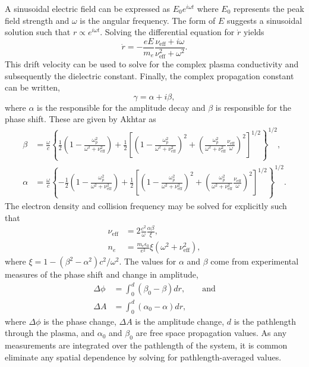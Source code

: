 A sinusoidal electric field can be expressed as $E_0 e^{i\omega t}$ where
$E_0$ represents the peak field strength and $\omega$ is the angular frequency.
The form of $E$ suggests a sinusoidal solution such that $r \propto e^{i\omega
t}$. Solving the differential equation for $\dot{r}$ yields
    \begin{equation}
        \dot{r} = -\frac{eE}{m_e}\frac{\nu_\mathrm{eff} + i\omega}
                                      {\nu_\mathrm{eff}^2 + \omega^2}.
    \end{equation}
This drift velocity can be used to solve for the complex plasma conductivity
and subsequently the dielectric constant. Finally, the complex propagation
constant can be written,
    \begin{equation}
        \gamma = \alpha + i\beta,
    \end{equation}
where $\alpha$ is the responsible for the amplitude decay and $\beta$ is
responsible for the phase shift. These are given by Akhtar as
    \newcommand{\ts}{\frac{\omega_p^2}{\omega^2 + \nu_\mathrm{eff}^2}}
    \begin{align}
        \beta & = \frac{\omega}{c} \left\{ \frac{1}{2} \left(1 - \ts \right)
                  + \frac{1}{2} \left[ \left( 1 - \ts \right)^2
                  + \left( \ts \frac{\nu_\mathrm{eff}}{\omega} \right)^2
                  \right]^{1/2} \right\}^{1/2}, \\
        \alpha & = \frac{\omega}{c} \left\{ -\frac{1}{2} \left(1 - \ts \right)
                   + \frac{1}{2} \left[ \left( 1 - \ts \right)^2
                   + \left( \ts \frac{\nu_\mathrm{eff}}{\omega} \right)^2
                   \right]^{1/2} \right\}^{1/2}.
    \end{align}
The electron density and collision frequency may be solved for explicitly such that
    \begin{align}
        \nu_\mathrm{eff} & = 2 \frac{c^2}{\omega}\frac{\alpha\beta}{\xi}, \\
        n_e & = \frac{m_e\epsilon_0}{e^2}\xi
                \left(\omega^2+\nu_\mathrm{eff}^2\right), 
    \end{align}
where $\xi = 1 - (\beta^2-\alpha^2)c^2/\omega^2$. The values for $\alpha$ and
$\beta$ come from experimental measures of the phase shift and change in
amplitude,
    \begin{align}
        \Delta \phi &= \int_0^d \left( \beta_0 - \beta\right)dr, \qquad
        \textrm{and} \\
        \Delta A &= \int_0^d \left( \alpha_0 - \alpha \right)dr,
    \end{align}
where $\Delta \phi$ is the phase change, $\Delta A$ is the amplitude change, $d$
is the pathlength through the plasma, and $\alpha_0$ and $\beta_0$ are free
space propagation values. As any measurements are integrated over the pathlength
of the system, it is common eliminate any spatial dependence by solving for
pathlength-averaged values.

